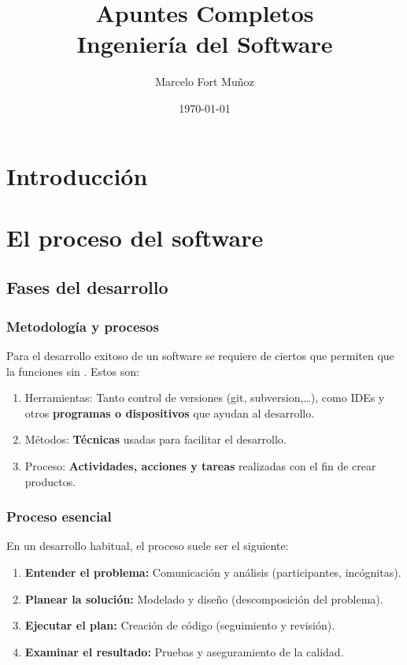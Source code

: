 \documentclass[a4paper,11pt]{report}
\title{Apuntes Completos \\ \large Ingeniería del Software}
\author{Marcelo Fort Muñoz}
\date{\today}
\begin{document}
    \maketitle
    \tableofcontents
    \newpage


    \chapter{Introducción}\label{ch:introduccion}
    

    \chapter{El proceso del software}\label{ch:el-proceso-del-software}
    \minitoc
    \section{Fases del desarrollo}\label{sec:fases-del-desarrollo}

    \subsection{Metodología y procesos}\label{subsec:metodologia-y-procesos}
    Para el desarrollo exitoso de un software se requiere de ciertos  que permiten que la  funciones sin .
    Estos  son:
    \begin{enumerate}
        \item Herramientas: Tanto control de versiones (git, subversion,\dots), como IDEs y otros \textbf{programas o dispositivos} que ayudan al desarrollo.
        \item Métodos: \textbf{Técnicas} usadas para facilitar el desarrollo.
        \item Proceso: \textbf{Actividades, acciones y tareas} realizadas con el fin de crear productos.
    \end{enumerate}

    \subsection{Proceso esencial}\label{subsec:proceso-esencial}
    En un desarrollo habitual, el proceso suele ser el siguiente:

    \begin{enumerate}
        \item \textbf{Entender el problema:} Comunicación y análisis (participantes, incógnitas).
        \item \textbf{Planear la solución:} Modelado y diseño (descomposición del problema).
        \item \textbf{Ejecutar el plan:} Creación de código (seguimiento y revisión).
        \item \textbf{Examinar el resultado:} Pruebas y aseguramiento de la calidad.
    \end{enumerate}
\end{document}
